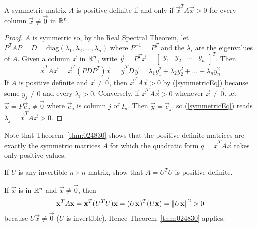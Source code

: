 \documentclass{ximera}
\begin{document}
\begin{theorem}\label{thm:024830}
A symmetric matrix $A$ is positive definite if and only if $\vec{x}^{T} A \vec{x} > 0$ for every column $\vec{x} \neq \vec{0}$ in $\mathbb{R}^n$.
\end{theorem}

\begin{proof}
$A$ is symmetric so, by the Real Spectral Theorem, let $P^{T}AP = D = \mbox{diag}(\lambda_{1}, \lambda_{2}, \dots, \lambda_{n})$ where $P^{-1} = P^{T}$ and the $\lambda_{i}$ are the eigenvalues of $A$. Given a column $\vec{x}$ in $\mathbb{R}^n$, write $\vec{y} = P^{T}\vec{x} = \left[ \begin{array}{cccc}
y_{1} & y_{2} & \dots & y_{n}
\end{array}\right]^T$. Then
\begin{equation} \label{symmetricEq}
\vec{x}^TA\vec{x} = \vec{x}^T(PDP^T)\vec{x} = \vec{y}^TD\vec{y} = \lambda_{1}y_{1}^2 + \lambda_{2}y_{2}^2 + \dots + \lambda_{n}y_{n}^2
\end{equation}
If $A$ is positive definite and $\vec{x} \neq \vec{0}$, then $\vec{x}^{T}A\vec{x} > 0$ by (\ref{symmetricEq}) because some $y_{j} \neq 0$ and every $\lambda_{i} > 0$. Conversely, if $\vec{x}^{T}A\vec{x} > 0$ whenever $\vec{x} \neq \vec{0}$, let $\vec{x} = P\vec{e}_{j} \neq \vec{0}$ where $\vec{e}_{j}$ is column $j$ of $I_{n}$. Then $\vec{y} = \vec{e}_{j}$, so (\ref{symmetricEq}) reads $\lambda_{j} = \vec{x}^{T}A\vec{x} > 0$.
\end{proof}

Note that Theorem~\ref{thm:024830} shows that the positive definite matrices are exactly the symmetric matrices $A$ for which the quadratic form $q = \vec{x}^{T}A\vec{x}$ takes only positive values.

\begin{example}\label{exa:024865}
If $U$ is any invertible $n \times n$ matrix, show that $A = U^{T}U$ is positive definite.


\begin{explanation}
  If $\vec{x}$ is in $\mathbb{R}^n$ and $\vec{x} \neq \vec{0}$, then
\begin{equation*}
\mathbf{x}^TA\mathbf{x} =  \mathbf{x}^T(U^TU)\mathbf{x} = (U\mathbf{x})^T(U\mathbf{x})= \left\lVert U\mathbf{x} \right\rVert^2 > 0
\end{equation*}
because $U\vec{x} \neq \vec{0}$ ($U$ is invertible). Hence Theorem~\ref{thm:024830} applies.
\end{explanation}
\end{example}
\end{document}
